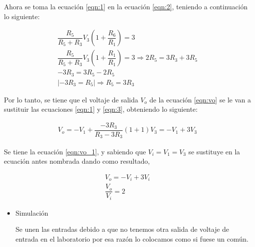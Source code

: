 \begin{enumerate}[label=\textbf{\arabic*.}, font=\bfseries]
\begin{itemize}
            Ahora se toma la ecuación \ref{eqn:1} en la ecuación \ref{eqn:2}, teniendo a continuación lo siguiente:

            \begin{gather}
                \dfrac{R_5}{R_5+R_3}V_3 \left(1+\dfrac{R_6}{R_1}\right)=3 \nonumber\\[0.5cm]
                \dfrac{R_5}{R_5+R_3}V_3 \left(1+\dfrac{R_1}{R_1}\right)=3 \Longrightarrow 2R_5=3R_3+3R_5 \nonumber\\[0.5cm]
                -3R_3=3R_5-2R_5 \nonumber\\[0.5cm]
                |-3R_3=R_5| \Longrightarrow R_5=3R_3 \label{eqn:3}           
            \end{gather}

            Por lo tanto, se tiene que el voltaje de salida $V_o$ de la ecuación \ref{eqn:vo} se le van a sustituir las ecuaciones \ref{eqn:1} y \ref{eqn:3}, obteniendo lo siguiente:

            \begin{gather}
                V_o=-V_1+\dfrac{-3R_3}{R_3-3R_3}(1+1)V_3=-V_1+3V_3 \label{eqn:vo_1}
            \end{gather}

            Se tiene la ecuación \ref{eqn:vo_1}, y sabiendo que $V_i=V_1=V_3$ se sustituye en la ecuación antes nombrada dando como resultado,

            \begin{gather}
                V_o=-V_i+3V_i \nonumber \\[0.5cm]
                \dfrac{V_o}{V_i}=2 \nonumber
            \end{gather}

            \begin{itemize}
                \item Simulación
                
                    Se unen las entradas debido a que no tenemos otra salida de voltaje de entrada en el laboratorio por esa razón lo colocamos como si fuese un común.


\end{itemize}
\end{itemize}
\end{enumerate}
